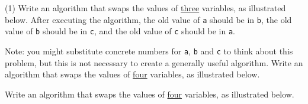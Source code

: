 \begin{exercise}
    \begin{longtasks}[resume=true](1)
        \task
        Write an algorithm that swaps the values of \underline{three} variables, as illustrated below. After executing the algorithm, the old value of \texttt{a} should be in \texttt{b}, the old value of \texttt{b} should be in \texttt{c}, and the old value of \texttt{c} should be in \texttt{a}.

        \SetVertexNormal[Shape      = circle,
        LineWidth  = .7pt]
        \SetUpEdge[lw         = .7pt,
        color      = black]
        \begin{center}
        \end{center}

        Note: you might substitute concrete numbers for \texttt{a}, \texttt{b} and \texttt{c} to think about this problem, but this is not necessary to create a generally useful algorithm.
        \task
        Write an algorithm that swaps the values of \underline{four} variables, as illustrated below.

        \SetVertexNormal[Shape      = circle,
        LineWidth  = .7pt]
        \SetUpEdge[lw         = .7pt,
        color      = black]
        \begin{center}
        \end{center}
        \task
        Write an algorithm that swaps the values of \underline{four} variables, as illustrated below.


\end{longtasks}
\end{exercise}
